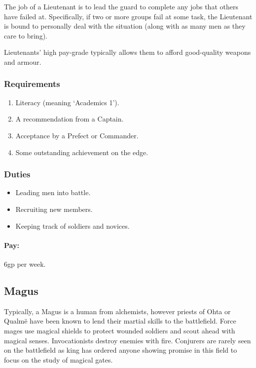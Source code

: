 \begin{multicols}{2}
The job of a Lieutenant is to lead the \gls{guard} to complete any jobs that others have failed at.
Specifically, if two or more groups fail at some task, the Lieutenant is bound to personally deal with the situation (along with as many men as they care to bring).

Lieutenants' high pay-grade typically allows them to afford good-quality weapons and armour.

\subsubsection{Requirements}

\begin{enumerate}
  \item
  Literacy (meaning `Academics 1').
  \item
  A recommendation from a Captain.
  \item
  Acceptance by a Prefect or Commander.
  \item
  Some outstanding achievement on the \gls{edge}.
\end{enumerate}

\subsubsection{Duties}

\begin{itemize}
  \item
  Leading men into battle.
  \item
  Recruiting new members.
  \item
  Keeping track of soldiers and novices.
\end{itemize}

\paragraph{Pay:} 6gp per week.

\subsection{Magus}

Typically, a Magus is a human from \gls{alchemists}, however priests of Ohta or Qualm\"e have been known to lend their martial skills to the battlefield.
Force mages use magical shields to protect wounded soldiers and scout ahead with magical senses.
Invocationists destroy enemies with fire.
Conjurers are rarely seen on the battlefield as \gls{king} has ordered anyone showing promise in this field to focus on the study of magical gates.


\end{multicols}
